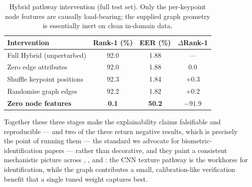 \documentclass[11pt]{article}
\begin{document}
\begin{table}[t]
  \centering
  \caption{Hybrid pathway intervention (full test set). Only the per-keypoint node features
  are causally load-bearing; the supplied graph geometry is essentially inert on clean
  in-domain data.}
  \label{tab:pathway}
  \small
  \begin{tabular}{lccc}
    \toprule
    Intervention & Rank-1 (\%) & EER (\%) & $\Delta$Rank-1 \\
    \midrule
    Full Hybrid (unperturbed) & 92.0 & 1.88 & --- \\
    Zero edge attributes      & 92.0 & 1.88 & $0.0$ \\
    Shuffle keypoint positions & 92.3 & 1.84 & $+0.3$ \\
    Randomise graph edges     & 92.2 & 1.82 & $+0.2$ \\
    \textbf{Zero node features} & \textbf{0.1} & \textbf{50.2} & $\mathbf{-91.9}$ \\
    \bottomrule
  \end{tabular}
\end{table}

Together these three stages make the explainability claims falsifiable and reproducible --- and two of the three return negative results, which is precisely the point of running them --- the
standard we advocate for biometric-identification papers --- rather than decorative, and they
paint a consistent mechanistic picture across , , and
: the CNN texture pathway is the workhorse for identification, while the
graph contributes a small, calibration-like verification benefit that a single tuned weight
captures best.

\end{document}
